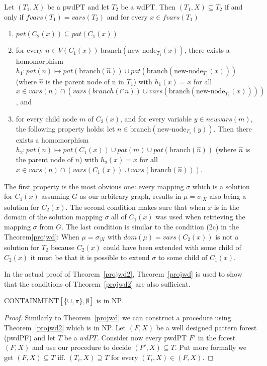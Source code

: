 \begin{theorem}\label{projwd2}
	Let $(T_1,X)$ be a pwdPT and let $T_2$ be a wdPT. Then $(T_1,X) \subseteq
	T_2$ if and only if $fvars(T_1) = vars(T_2)$ and for every $x \in
	fvars(T_1)$
	\begin{enumerate}
		\item $pat(C_2(x)) \subseteq pat(C_1(x))$
		\item for every $n \in V(C_1(x)) \ \mbox{branch} (\mbox{new-node}_{T_1}(x))$, there
			exists a homomorphism $h_1: pat(n) \mapsto pat(\mbox{branch}(\hat{n})) \cup
			pat(\mbox{branch}(\mbox{new-node}_{T_1}(x)))$ (where $\hat{n}$ is the parent node
			of n in $T_1$) with $h_1(x) = x$ for all $x \in vars(n) \cap
			(vars(branch(\cap{n})) \cup vars(\mbox{branch}(\mbox{new-node}_{T_1}(x))))$, and
		\item for every child node $m$ of $C_2(x)$, and for every variable $y
			\in newvars(m)$, the following property holds: let $n \in
			\mbox{branch}(\mbox{new-node}_{T_1}(y))$. Then there exists a homomorphism
			$h_2:pat(n) \mapsto pat(C_1(x)) \cup pat(m) \cup
			pat(\mbox{branch}(\hat{n}))$ (where $\hat{n}$ is the parent node of $n$)
			with $h_2(x) = x$ for all $x \in vars(n) \cap (vars(C_1(x)) \cup
			vars(\mbox{branch}(\hat{n})))$.
	\end{enumerate}
\end{theorem}
\begin{proofidea}
	The first property is the most obvious one: every mapping $\sigma$ which is
	a solution for $C_1(x)$ assuming $G$ as our arbitrary graph, results in $\mu =
	\sigma_{|X}$ also being a solution for $C_2(x)$.
	The second condition makes sure that when $x$ is in the domain of the
	solution mapping $\sigma$ all of $C_1(x)$ was used when retrieving the
	mapping $\sigma$ from $G$.
	The last condition is similar to the condition (2c) in the
	Theorem\ref{projwd}: When $\mu = \sigma_{|X}$ with $dom(\mu) =
	vars(C_2(x))$ is not a solution for $T_2$ because $C_2(x)$ could have been
	extended with some child of $C_2(x)$ it must be that it is possible to
	extend $\sigma$ to some child of $C_1(x)$.
\end{proofidea}

In the actual proof of Theorem~\ref{projwd2}, Theorem~\ref{projwd} is used to show
that the conditions of Theorem~\ref{projwd2} are also sufficient.

\begin{theorem}\label{ccuppiempty}
	CONTAINMENT$[\{\cup,\pi\},\emptyset]$ is in NP.
\end{theorem}
\begin{proof}
	Similarly to Theorem~\ref{projwd} we can construct a procedure using Theorem~\ref{projwd2} 
	which is in NP.
	Let $(F,X)$ be a well designed pattern forest (pwdPF) and let $T$ be a
	$wdPT$. Consider now every pwdPT $F'$ in the forest $(F,X)$ and
	use our procedure to decide $(F',X) \subseteq T$. Put more formally we get $(F,X) \subseteq T$ iff.
	$(T_i,X) \supseteq T$ for every $(T_i,X) \in (F,X)$.
\end{proof}

